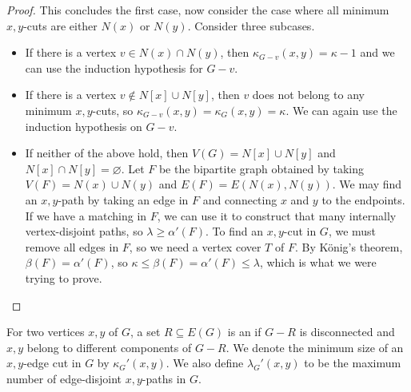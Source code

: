 \begin{proof}
  This concludes the first case, now consider the case where all minimum
  $x,y$-cuts are either $N(x)$ or $N(y)$.
  Consider three subcases.
  \begin{itemize}
  \item If there is a vertex $v \in N(x) \cap N(y)$, then $\kappa_{G - v}(x,y) =
	\kappa-1$ and we can use the induction hypothesis for $G-v$.
  \item If there is a vertex $v \notin N[x] \cup N[y]$, then $v$ does not belong
	to any minimum $x,y$-cuts, so $\kappa_{G-v}(x,y) = \kappa_G(x,y) = \kappa$.
	We can again use the induction hypothesis on $G-v$.
  \item If neither of the above hold, then $V(G) = N[x] \cup N[y]$ and $N[x]
	\cap N[y] = \varnothing$.
	Let $F$ be the bipartite graph obtained by taking $V(F) = N(x) \cup N(y)$
	and $E(F) = E(N(x), N(y))$.
	We may find an $x,y$-path by taking an edge in $F$ and connecting $x$ and
	$y$ to the endpoints.
	If we have a matching in $F$, we can use it to construct that many
	internally vertex-disjoint paths, so $\lambda \ge \alpha'(F)$.
	To find an $x,y$-cut in $G$, we must remove all edges in $F$, so we need a
	vertex cover $T$ of $F$.
	By König's theorem, $\beta(F) = \alpha'(F)$, so $\kappa \le \beta(F) =
	\alpha'(F) \le \lambda$, which is what we were trying to prove.
	\qedhere
  \end{itemize}
\end{proof}

\begin{definition}
  For two vertices $x,y$ of $G$, a set $R \subseteq E(G)$ is an
   if $G-R$ is disconnected and $x,y$ belong to different
  components of $G-R$.
  We denote the minimum size of an $x,y$-edge cut in $G$ by $\kappa_G'(x,y)$.
  We also define $\lambda_G'(x,y)$ to be the maximum number of edge-disjoint
  $x,y$-paths in $G$.
\end{definition}

